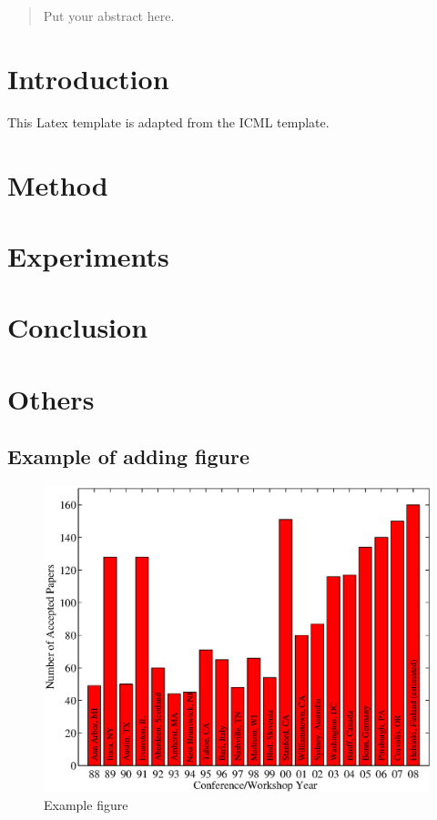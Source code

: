 \documentclass{article}
\begin{document}

\begin{abstract}
Put your abstract here.
\end{abstract}

\section{Introduction}

This Latex template is adapted from the ICML template.

\section{Method}

\section{Experiments}

\section{Conclusion}

\section{Others}

\subsection{Example of adding figure}

\begin{figure}[ht]
\vskip 0.2in
\begin{center}
\centerline{\includegraphics[width=0.85\columnwidth]{example}}
\caption{Example figure}
\label{example}
\end{center}
\vskip -0.2in
\end{figure}
\end{document}
